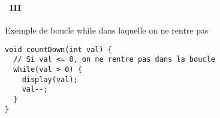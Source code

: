 \begin{frame}[containsverbatim]
  \frametitle{\secname}
  \framesubtitle{\subsecname~III}

  \begin{exampleblock}{Exemple de boucle while dans laquelle on ne rentre pas}
    \begin{verbatim}
void countDown(int val) {
  // Si val <= 0, on ne rentre pas dans la boucle
  while(val > 0) { 
    display(val);
    val--;
  }
}\end{verbatim}
  \end{exampleblock}
\end{frame}

